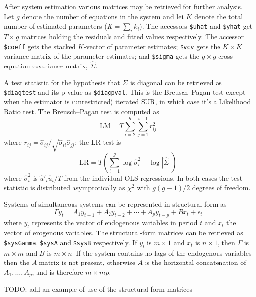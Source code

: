 After system estimation various matrices may be retrieved for further
analysis.  Let $g$ denote the number of equations in the system and
let $K$ denote the total number of estimated parameters ($K = \sum_i
k_i$). The accessors \verb|$uhat| and \verb|$yhat| get $T \times g$
matrices holding the residuals and fitted values respectively. The
accessor \verb|$coeff| gets the stacked $K$-vector of parameter
estimates; \verb|$vcv| gets the $K \times K$ variance matrix of the
parameter estimates; and \verb|$sigma| gets the $g \times g$
cross-equation covariance matrix, $\hat{\Sigma}$.

A test statistic for the hypothesis that $\Sigma$ is diagonal can be
retrieved as \verb|$diagtest| and its p-value as
\verb|$diagpval|. This is the Breusch--Pagan test except when the
estimator is (unrestricted) iterated SUR, in which case it's a
Likelihood Ratio test. The Breusch--Pagan test is computed as
\[
\mbox{LM} = T \sum_{i=2}^g \sum_{j=1}^{i-1} r^2_{ij}
\]
where $r_{ij} = \hat{\sigma}_{ij} /
\sqrt{\hat{\sigma}_{ii}\hat{\sigma}_{jj}}$; the LR test is
\[
\mbox{LR} = T \left(\sum_{i=1}^g \log \hat{\sigma}^2_i -\log 
 |\hat{\Sigma}| \right)
\]
where $\hat{\sigma}^2_i$ is $\hat{u}'_i \hat{u}_i / T$ from the
individual OLS regressions. In both cases the test statistic is
distributed asymptotically as $\chi^2$ with $g(g-1)/2$ degrees of
freedom. 

Systems of simultaneous systems can be represented in structural form
as
\[
\Gamma y_t = A_1 y_{t-1} + A_2 y_{t-2} + \cdots + A_p y_{t-p}
 + B x_t + \epsilon_t
\]
where $y_t$ represents the vector of endogenous variables in period
$t$ and $x_t$ the vector of exogenous variables.  The structural-form
matrices can be retrieved as \verb|$sysGamma|, \verb|$sysA| and
\verb|$sysB| respectively. If $y_t$ is $m \times 1$ and $x_t$ is $n
\times 1$, then $\Gamma$ is $m \times m$ and $B$ is $m \times n$. If
the system contains no lags of the endogenous variables then the $A$
matrix is not present, otherwise $A$ is the horizontal concatenation
of $A_1,\dots,A_p$, and is therefore $m \times mp$.

TODO: add an example of use of the structural-form matrices



